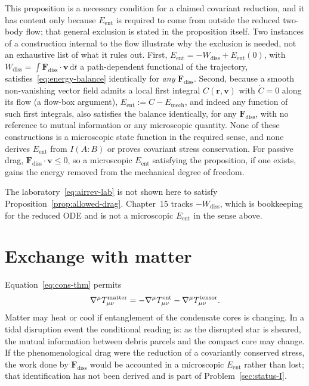 This proposition is a necessary condition for a claimed covariant
reduction, and it has content only because \(E_{\mathrm{ent}}\) is
required to come from outside the reduced two-body flow; that
general exclusion is stated in the proposition itself. Two instances
of a construction internal to the flow illustrate why the exclusion
is needed, not an exhaustive list of what it rules out. First,
\(E_{\mathrm{ent}}=-W_{\mathrm{diss}}+E_{\mathrm{ent}}(0)\), with
\(W_{\mathrm{diss}}=\int\mathbf{F}_{\mathrm{diss}}\cdot\mathbf{v}\,
\mathrm{d}t\) a path-dependent functional of the trajectory,
satisfies~\eqref{eq:energy-balance} identically for \emph{any}
\(\mathbf{F}_{\mathrm{diss}}\). Second, because a smooth
non-vanishing vector field admits a local first integral
\(C(\mathbf r,\mathbf v)\) with \(\dot C=0\) along its flow (a
flow-box argument), \(E_{\mathrm{ent}}:=C-E_{\mathrm{mech}}\), and
indeed any function of such first integrals, also satisfies the
balance identically, for any \(\mathbf F_{\mathrm{diss}}\), with no
reference to mutual information or any microscopic quantity. None of
these constructions is a microscopic state function in the required
sense, and none derives \(E_{\mathrm{ent}}\) from \(I(A:B)\) or
proves covariant stress conservation. For passive drag,
\(\mathbf{F}_{\mathrm{diss}}\cdot\mathbf{v}\leq0\), so a microscopic
\(E_{\mathrm{ent}}\) satisfying the proposition, if one exists, gains
the energy removed from the mechanical degree of freedom.

The laboratory~\eqref{eq:airrev-lab} is not shown here to satisfy
Proposition~\ref{prop:allowed-drag}. Chapter~15 tracks
\(-W_{\mathrm{diss}}\), which is bookkeeping for the reduced ODE
and is not a microscopic \(E_{\mathrm{ent}}\) in the sense above.

\section{Exchange with matter}
\label{sec:ch11-exchange}

Equation~\eqref{eq:cons-thm} permits
\begin{equation}
  \label{eq:exchange}
  \nabla^\mu T_{\mu\nu}^{\mathrm{matter}}
  =-\nabla^\mu T^{\mathrm{ent}}_{\mu\nu}
   -\nabla^\mu T_{\mu\nu}^{\mathrm{tensor}}.
\end{equation}
Matter may heat or cool if entanglement of the condensate
cores is changing. In a tidal disruption event the conditional
reading is: as the disrupted star is sheared, the mutual information
between debris parcels and the compact core may change. If the
phenomenological drag were the reduction of a covariantly conserved
stress, the work done by \(\mathbf{F}_{\mathrm{diss}}\) would be
accounted in a microscopic \(E_{\mathrm{ent}}\) rather than lost;
that identification has not been derived and is part of
Problem~\ref{sec:status-I}.

